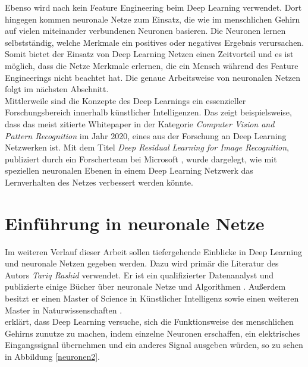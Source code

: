 Ebenso wird nach \citet[]{Janiesch.2021} kein Feature Engineering beim Deep Learning verwendet. Dort hingegen kommen neuronale Netze zum Einsatz, die wie im menschlichen Gehirn auf vielen miteinander verbundenen Neuronen basieren. Die Neuronen lernen selbstständig, welche Merkmale ein positives oder negatives Ergebnis verursachen. Somit bietet der Einsatz von Deep Learning Netzen einen Zeitvorteil und es ist möglich, dass die Netze Merkmale erlernen, die ein Mensch während des Feature Engineerings nicht beachtet hat. Die genaue Arbeitsweise von neuronalen Netzen folgt im nächsten Abschnitt.\\

Mittlerweile sind die Konzepte des Deep Learnings ein essenzieller Forschungsbereich innerhalb künstlicher Intelligenzen. Das zeigt beispielsweise, dass das meist zitierte Whitepaper in der Kategorie \textit{Computer Vision and Pattern Recognition} im Jahr 2020, eines aus der Forschung an Deep Learning Netzwerken ist. Mit dem Titel \textit{Deep Residual Learning for Image Recognition}, publiziert durch ein Forscherteam bei Microsoft \parencite[]{crew2020}, wurde dargelegt, wie mit speziellen neuronalen Ebenen in einem Deep Learning Netzwerk das Lernverhalten des Netzes verbessert werden könnte.


\section{Einführung in neuronale Netze}
Im weiteren Verlauf dieser Arbeit sollen tiefergehende Einblicke in Deep Learning und neuronale Netzen gegeben werden. Dazu wird primär die Literatur des Autors \textit{Tariq Rashid} verwendet. Er ist ein qualifizierter Datenanalyst und publizierte einige Bücher über neuronale Netze und Algorithmen \parencite[]{educative-no-date}. Außerdem besitzt er einen Master of Science in Künstlicher Intelligenz sowie einen weiteren Master in Naturwissenschaften \parencite[]{linkedin-no-date}.\\

\citet[S. 32]{traiq_neuron} erklärt, dass Deep Learning versuche, sich die Funktionsweise des menschlichen Gehirns zunutze zu machen, indem einzelne Neuronen erschaffen, ein elektrisches Eingangssignal übernehmen und ein anderes Signal ausgeben würden, so zu sehen in Abbildung \ref{neuronen2}.


